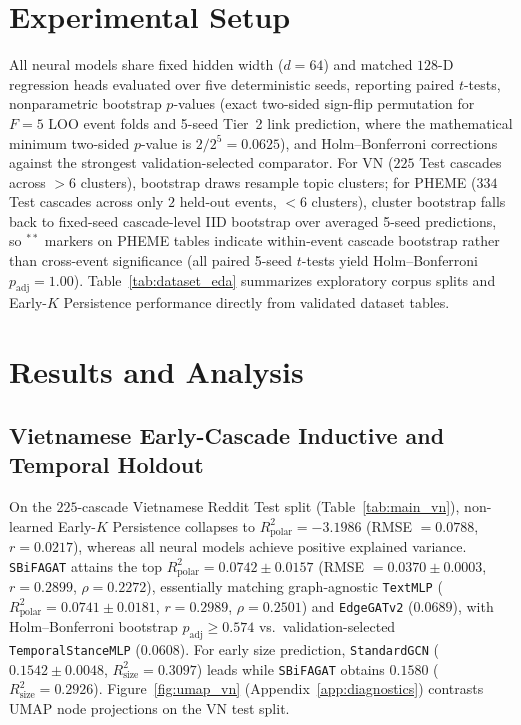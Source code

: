\documentclass[conference]{IEEEtran}
\begin{document}
\section{Experimental Setup}
All neural models share fixed hidden width ($d=64$) and matched $128$-D regression heads evaluated over five deterministic seeds, reporting paired $t$-tests, nonparametric bootstrap $p$-values (exact two-sided sign-flip permutation for $F=5$ LOO event folds and 5-seed Tier~2 link prediction, where the mathematical minimum two-sided $p$-value is $2/2^5 = 0.0625$), and Holm--Bonferroni corrections against the strongest validation-selected comparator. For VN ($225$ Test cascades across $>6$ clusters), bootstrap draws resample topic clusters; for PHEME ($334$ Test cascades across only $2$ held-out events, $<6$ clusters), cluster bootstrap falls back to fixed-seed cascade-level IID bootstrap over averaged 5-seed predictions, so $^{**}$ markers on PHEME tables indicate within-event cascade bootstrap rather than cross-event significance (all paired 5-seed $t$-tests yield Holm--Bonferroni $p_{\text{adj}} = 1.00$). Table~\ref{tab:dataset_eda} summarizes exploratory corpus splits and Early-$K$ Persistence performance directly from validated dataset tables.


\section{Results and Analysis}\label{sec:results}
\subsection{Vietnamese Early-Cascade Inductive and Temporal Holdout}
On the $225$-cascade Vietnamese Reddit Test split (Table~\ref{tab:main_vn}), non-learned Early-$K$ Persistence collapses to $R^2_{\text{polar}} = -3.1986$ (RMSE $= 0.0788$, $r = 0.0217$), whereas all neural models achieve positive explained variance. \texttt{SBiFAGAT} attains the top $R^2_{\text{polar}} = 0.0742 \pm 0.0157$ (RMSE $= 0.0370 \pm 0.0003$, $r = 0.2899$, $\rho = 0.2272$), essentially matching graph-agnostic \texttt{TextMLP} ($R^2_{\text{polar}} = 0.0741 \pm 0.0181$, $r = 0.2989$, $\rho = 0.2501$) and \texttt{EdgeGATv2} ($0.0689$), with Holm--Bonferroni bootstrap $p_{\text{adj}} \ge 0.574$ vs.\ validation-selected \texttt{TemporalStanceMLP} ($0.0608$). For early size prediction, \texttt{StandardGCN} ($0.1542 \pm 0.0048$, $R^2_{\text{size}} = 0.3097$) leads while \texttt{SBiFAGAT} obtains $0.1580$ ($R^2_{\text{size}} = 0.2926$). Figure~\ref{fig:umap_vn} (Appendix~\ref{app:diagnostics}) contrasts UMAP node projections on the VN test split.
\end{document}
